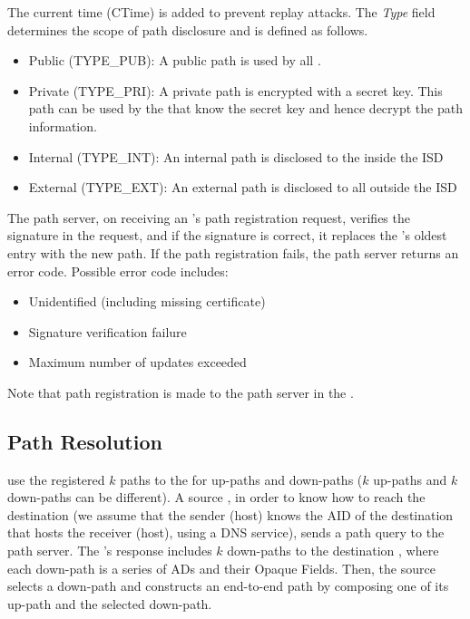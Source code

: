 \noindent The current time (CTime) is added to prevent replay attacks. The {\em Type} field determines the scope of path disclosure and is defined as follows. %
\begin{itemize}
\item {Public (TYPE\_PUB): } A public path is used by all \ADs. %
\item {Private (TYPE\_PRI): } A private path is encrypted with a secret key. This path can be used by the \ADs that know the secret key and hence decrypt the path information. %
\item {Internal (TYPE\_INT): } An internal path is disclosed to the \ADs inside the ISD %
\item {External (TYPE\_EXT): } An external path is disclosed to all \ADs outside the ISD %
\end{itemize}

The \ISDC path server, on receiving an \AD's path registration request, verifies the signature in the request, and if the signature is correct, it replaces the \AD's oldest entry with the new path. If the path registration fails, the path server returns an error code. Possible error code includes:

\begin{itemize}
\item Unidentified \AD (including missing \AD certificate)
\item Signature verification failure
\item Maximum number of updates exceeded
\end{itemize}

Note that path registration is made to the path server in the \ISDC.

\subsection{Path Resolution} 
\STUB \ADs use the registered $k$ paths to the \ISDC for up-paths and down-paths ($k$ up-paths and $k$ down-paths can be different). A source \AD, in order to know how to reach the destination \AD (we assume that the sender (host) knows the AID of the destination \AD that hosts the receiver (host), using a DNS service), sends a path query to the \ISDC path server. The \ISDC \PS's response includes $k$ down-paths to the destination \AD, where each down-path is a series of ADs and their Opaque Fields. Then, the source \AD selects a down-path and constructs an end-to-end path by composing one of its up-path and the selected down-path.

